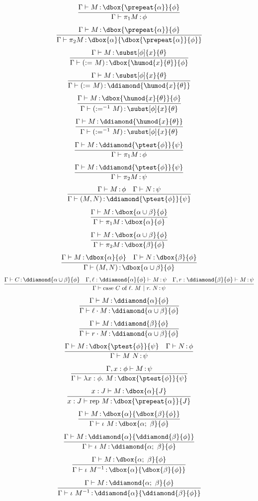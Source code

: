 \documentclass[12pt]{cmuthesis}
\theoremstyle{definition}
\theoremstyle{remark}
\begin{document}
\[\infer{\proves{\G}{\eprojL{M}}{\phi}}
        {\proves{\G}{M}{\dbox{\prepeat{\alpha}}{\phi}}}\]
\[\infer{\proves{\G}{\eprojR{M}}{\dbox{\alpha}{\dbox{\prepeat{\alpha}}{\phi}}}}
        {\proves{\G}{M}{\dbox{\prepeat{\alpha}}{\phi}}}\]
\[\infer{\proves{\G}{(\easgn{M})}{\dbox{\humod{x}{\theta}}{\phi}}}
        {\proves{\G}{M}{\subst[\phi]{x}{\theta}}}\]
\[\infer{\proves{\G}{(\easgn{M})}{\ddiamond{\humod{x}{\theta}}}}
        {\proves{\G}{M}{\subst[\phi]{x}{\theta}}}\]
\[\infer{\proves{\G}{\easgninv{M}}{\subst[\phi]{x}{\theta}}}
        {\proves{\G}{M}{\dbox{\humod{x}{\theta}}{\phi}}}\]
\[\infer{\proves{\G}{\easgninv{M}}{\subst[\phi]{x}{\theta}}}
        {\proves{\G}{M}{\ddiamond{\humod{x}{\theta}}}}\]
\[\infer{\proves{\G}{\eprojL{M}}{\phi}}
        {\proves{\G}{M}{\ddiamond{\ptest{\phi}}{\psi}}}\]
\[\infer{\proves{\G}{\eprojR{M}}{\psi}}
        {\proves{\G}{M}{\ddiamond{\ptest{\phi}}{\psi}}}\]
\[\infer{\proves{\G}{\econs{M}{N}}{\ddiamond{\ptest{\phi}}{\psi}}}
        {\proves{\G}{M}{\phi} & \proves{\G}{N}{\psi}}\]
\[\infer{\proves{\G}{\eprojL{M}}{\dbox{\alpha}{\phi}}}
        {\proves{\G}{M}{\dbox{\alpha\cup\beta}{\phi}}}\]
\[\infer{\proves{\G}{\eprojR{M}}{\dbox{\beta}{\phi}}}
        {\proves{\G}{M}{\dbox{\alpha\cup\beta}{\phi}}}\]
\[\infer{\proves{\G}{\econs{M}{N}}{\dbox{\alpha\cup\beta}{\phi}}}
        {\proves{\G}{M}{\dbox{\alpha}{\phi}} & \proves{\G}{N}{\dbox{\beta}{\phi}}}\]
\[\infer{\proves{\G}{\ecase{C}{M}{N}}{\psi}}
        {\proves{\G}{C}{\ddiamond{\alpha\cup\beta}{\phi}}
        &\proves{\G,\ell:\ddiamond{\alpha}{\phi}}{M}{\psi}
        &\proves{\G,r:\ddiamond{\beta}{\phi}}{M}{\psi}}\]
\[\infer{\proves{\G}{\einjL{M}}{\ddiamond{\alpha\cup\beta}{\phi}}}
        {\proves{\G}{M}{\ddiamond{\alpha}{\phi}}}\]
\[\infer{\proves{\G}{\einjR{M}}{\ddiamond{\alpha\cup\beta}{\phi}}}
        {\proves{\G}{M}{\ddiamond{\beta}{\phi}}}\]
\[\infer{\proves{\G}{\eapp{M}{N}}{\psi}}
        {\proves{\G}{M}{\dbox{\ptest{\phi}}{\psi}} 
        &\proves{\G}{N}{\phi}}\]
\[\infer{\proves{\G}{\elam{\phi}{M}}{\dbox{\ptest{\phi}}{\psi}}}
        {\proves{\G,x:\phi}{M}{\psi}}\]
\[\infer{\proves{x:J}{\erep{M}}{\dbox{\prepeat{\alpha}}{J}}}
        {\proves{x:J}{M}{\dbox{\alpha}{J}}}\]
\[\infer{\proves{\G}{\eseq{M}}{\dbox{\alpha;~\beta}{\phi}}}
        {\proves{\G}{M}{\dbox{\alpha}{\dbox{\beta}{\phi}}}}\]
\[\infer{\proves{\G}{\eseq{M}}{\ddiamond{\alpha;~\beta}{\phi}}}
        {\proves{\G}{M}{\ddiamond{\alpha}{\ddiamond{\beta}{\phi}}}}\]
\[\infer{\proves{\G}{\eseqinv{M}}{\dbox{\alpha}{\dbox{\beta}{\phi}}}}
        {\proves{\G}{M}{\dbox{\alpha;~\beta}{\phi}}}\]
\[\infer{\proves{\G}{\eseqinv{M}}{\ddiamond{\alpha}{\ddiamond{\beta}{\phi}}}}
        {\proves{\G}{M}{\ddiamond{\alpha;~\beta}{\phi}}}\]
\end{document}

